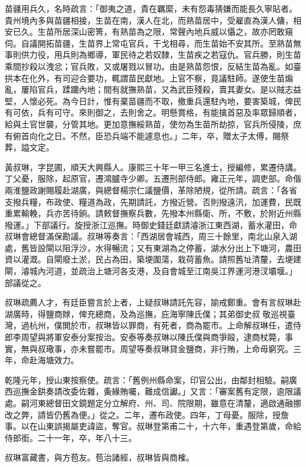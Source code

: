 \begin{pinyinscope}
苗疆用兵久，名時疏言：「御夷之道，貴在羈縻，未有怨毒猜嫌而能長久寧貼者。貴州境內多與苗疆相接，生苗在南，漢人在北，而熟苗居中，受雇直為漢人傭，相安已久。生苗所居深山密箐，有熟苗為之限，常聲內地兵威以懾之，故亦罔敢窺伺。自議開拓苗疆，生苗界上常屯官兵，干戈相尋，而生苗始不安其所。至熟苗無事則供力役，用兵則為鄉導，軍民待之若奴隸，生苗疾之若寇仇。官兵勝，則生苗乘間抄殺以洩忿；官兵敗，又或屠戮以冒功。由是熟苗怨恨，反結生苗為亂。如臺拱本在化外，有司迎合要功，輒謂苗民獻地。上官不察，竟議駐師。遂使生苗煽亂，屢陷官兵，蹂躪內地；間有就撫熟苗，又為武臣殘殺，賣其妻女。是以賊志益堅，人懷必死。為今日計，惟有棄苗疆而不取，撤重兵還駐內地，要害築城，俾民有可依，兵有可守。來則御之，去則舍之。明懸賞格，有能擒首惡及率眾歸順者，給與土官世襲，分管其地。更加意撫綏熟苗，使勿為生苗所劫掠，官兵所侵陵，庶有俯首向化之日。不然，臣恐兵端不能遽息也。」二年，卒，贈太子太傅，賜祭葬，謚文定。

黃叔琳，字昆圃，順天大興縣人。康熙三十年一甲三名進士，授編修，累遷侍講。丁父憂，服除，起原官，遷鴻臚寺少卿。五遷刑部侍郎。雍正元年，調吏部。命偕兩淮鹽政謝賜履赴湖廣，與總督楊宗仁議鹽價，革除陋規，從所請。疏言：「各省支撥兵糧，布政使、糧道為政，先期請託，方撥近營。否則撥遠汛，加運費，民既重累輸輓，兵亦苦待餉。請敕督撫察兵數，先撥本州縣衛、所，不敷，於附近州縣撥運。」下部議行。旋授浙江巡撫。時御史錢廷獻請濬浙江東西湖，蓄水灌田，命叔琳會總督滿保勘議。叔琳等奏言：「西湖居會城西，周三十餘里，南北山泉入湖處，舊皆設閘以阻浮沙，水得暢流；又有東湖為之停蓄，湖水分出上下塘河，農田資以灌溉。自閘廢土淤，民占為田，築埂圍蕩，栽荷蓄魚。請照舊址清釐，去埂建閘，濬城內河道，並疏治上塘河各支港，及自會城至江南吳江界運河港汊壩堰。」部議從之。

叔琳疏薦人才，有廷臣嘗言於上者，上疑叔琳請託先容，諭戒鄭重。會有言叔琳赴湖廣時，得鹽商賕，俾充總商，及為巡撫，庇海寧陳氏僕；其弟御史叔敬巡視臺灣，過杭州，僕閧於市，叔琳皆以罪商，有死者，商為罷市。上命解叔琳任，遣侍郎李周望與將軍安泰分案按治。安泰等奏叔琳以陳氏僕與商爭毆，逮商杖斃，事實，無與叔璥事，亦未嘗罷市。周望等奏叔琳貸金鹽商，非行賄，上命毋窮究。三年，命赴海塘效力。

乾隆元年，授山東按察使。疏言：「舊例州縣命案，印官公出，由鄰封相驗。嗣廣西巡撫金鉷奏請改委佐雜，夤緣賄囑，難成信讞。」又言：「審案舊有定限，逾限議處。嗣河東總督田文鏡題定分立解府、州、司、院限期，雖意在清釐，適啟通融挪改之弊，請皆仍舊為便。」從之。二年，遷布政使。四年，丁母憂。服除，授詹事。以在山東誤揭屬吏諱盜，奪官。叔琳登第甫二十，十六年，重遇登第歲，命給侍郎銜。二十一年，卒，年八十三。

叔琳富藏書，與方苞友。苞治諸經，叔琳皆與商榷。


\end{pinyinscope}
